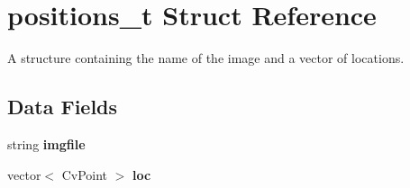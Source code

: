 \hypertarget{structpositions__t}{
\section{positions\_\-t Struct Reference}
\label{structpositions__t}
}


A structure containing the name of the image and a vector of locations.  


\subsection*{Data Fields}
\begin{DoxyCompactItemize}
\item 
\hypertarget{structpositions__t_a83197d2a88dccc50741f9b843bf490df}{
string {\bfseries imgfile}}
\label{structpositions__t_a83197d2a88dccc50741f9b843bf490df}

\item 
\hypertarget{structpositions__t_acd3f023d43c2e09260a1e98cadae8207}{
vector$<$ CvPoint $>$ {\bfseries loc}}
\label{structpositions__t_acd3f023d43c2e09260a1e98cadae8207}

\end{DoxyCompactItemize}
